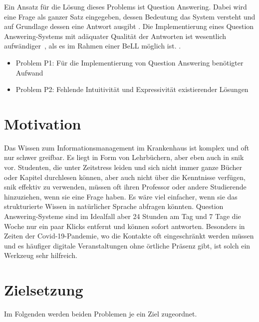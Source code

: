 Ein Ansatz für die Lösung dieses Problems ist Question Answering.
Dabei wird eine Frage als ganzer Satz eingegeben, dessen Bedeutung das System versteht und auf Grundlage dessen eine Antwort ausgibt \citep{qadefinition}.
Die Implementierung eines Question Answering-Systems mit adäquater Qualität der Antworten ist wesentlich aufwändiger~\citep[S.~3]{qanswer}, als es im Rahmen einer BeLL möglich ist.
.
\begin{itemize}
	\item Problem P1: Für die Implementierung von Question Answering benötigter Aufwand
	\item Problem P2: Fehlende Intuitivität und Expressivität existierender Lösungen
\end{itemize}

\section{Motivation}

Das Wissen zum Informationsmanagement im Krankenhaus ist komplex und oft nur schwer greifbar.
Es liegt in Form von Lehrbüchern, aber eben auch in \acs{snik} vor.
Studenten, die unter Zeitstress leiden und sich nicht immer ganze Bücher oder Kapitel durchlesen können, aber auch nicht über die Kenntnisse verfügen, \acs{snik} effektiv zu verwenden,
müssen oft ihren Professor oder andere Studierende hinzuziehen, wenn sie eine Frage haben.
Es wäre viel einfacher, wenn sie das strukturierte Wissen in natürlicher Sprache abfragen könnten.
Question Answering-Systeme sind im Idealfall aber 24 Stunden am Tag und 7 Tage die Woche nur ein paar Klicks entfernt und können sofort antworten. 
Besonders in Zeiten der Covid-19-Pandemie, wo die Kontakte oft eingeschränkt werden müssen und es häufiger digitale Veranstaltungen ohne örtliche Präsenz gibt, ist solch ein Werkzeug sehr hilfreich.

\section{Zielsetzung}\label{sec:zielsetzung}

Im Folgenden werden beiden Problemen je ein Ziel zugeordnet.


